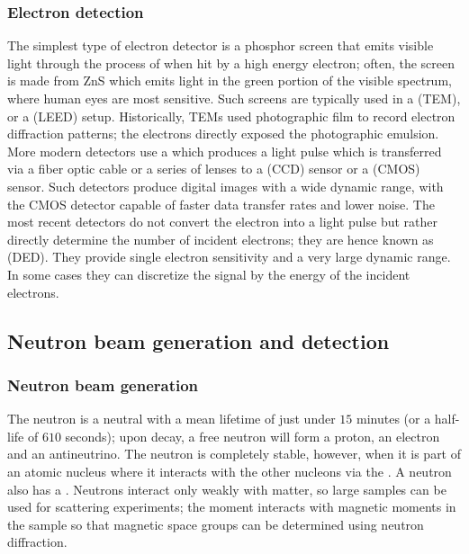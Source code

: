\subsubsection{Electron detection}\label{\chabbr:ssec:edetection}
The simplest type of electron detector is a phosphor screen that emits visible light through the process of  when hit by a high energy electron; often, the screen is made from ZnS which emits light in the green portion of the visible spectrum, where human eyes are most sensitive.  Such screens are typically used in a  (TEM), or a  (LEED) setup.  Historically, TEMs used photographic film to record electron diffraction patterns; the electrons directly exposed the photographic emulsion.  More modern detectors use a  which produces a light pulse which is transferred via a fiber optic cable or a series of lenses to a  (CCD) sensor or a  (CMOS) sensor. Such detectors produce digital images with a wide dynamic range, with the CMOS detector capable of faster data transfer rates and lower noise.  The most recent detectors do not convert the electron into a light pulse but rather directly determine the number of incident electrons; they are hence known as  (DED). They provide single electron sensitivity and a very large dynamic range.  In some cases they can discretize the signal by the energy of the incident electrons.


\subsection{Neutron beam generation and detection}\label{\chabbr:ssec:nprod}

\subsubsection{Neutron beam generation}

The neutron is a neutral  with a mean lifetime of just under $15$ minutes (or a half-life of $610$ seconds); upon decay,  a free neutron will form a proton, an electron and an antineutrino. The neutron is completely stable, however, when it is part of an atomic nucleus where it interacts with the other nucleons via the . A neutron also has a .  Neutrons interact only weakly with matter, so large samples can be used for scattering experiments; the moment interacts with magnetic moments in the sample so that magnetic space groups can be determined using neutron diffraction.

